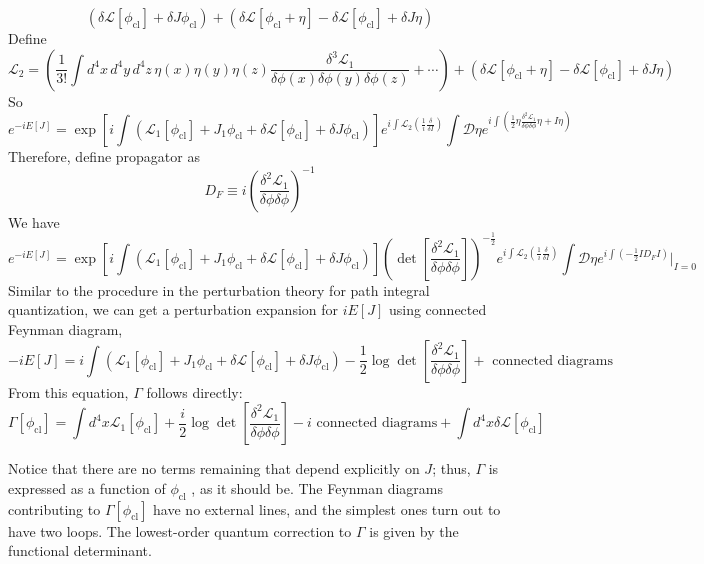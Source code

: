 \[(\delta \mathcal{L}[\phi_{\mathrm{cl}}] + \delta J \phi_{\mathrm{cl}} ) + ( \delta \mathcal{L}[\phi_{\mathrm{cl}} + \eta] - \delta\mathcal{L} [\phi_{\mathrm{cl}}] + \delta J \eta)\]
Define
\[\mathcal{L}_2 = \left(\frac{1}{3!} \int d^4x \, d^4y \, d^4z \, \eta(x) \eta(y) \eta(z) \frac{\delta^3 \mathcal{L}_1}{\delta \phi(x) \delta \phi(y) \delta \phi(z)} + \cdots \right) + ( \delta \mathcal{L}[\phi_{\mathrm{cl}} + \eta] - \delta\mathcal{L} [\phi_{\mathrm{cl}}] + \delta J \eta)\]
So
\[e^{-iE[J]} = \exp \left[ i \int ( \mathcal{L}_1 [\phi_{\mathrm{cl}}] + J_1\phi_{\mathrm{cl}} + \delta \mathcal{L}[\phi_{\mathrm{cl}}] + \delta J \phi_{\mathrm{cl}} )\right] e^{i\int \mathcal{L}_2(\frac{1}{i} \frac{\delta}{\delta I})} \int \mathcal{D}\eta e^{i\int \left(\frac{1}{2} \eta \frac{\delta^2 \mathcal{L}_1}{\delta \phi \delta \phi} \eta + I\eta \right)}\]
Therefore, define propagator as
\[D_F \equiv i \left( \frac{\delta^2 \mathcal{L}_1}{\delta \phi \delta \phi}\right)^{-1}\]
We have
\[e^{-iE[J]} = \exp \left[ i \int ( \mathcal{L}_1 [\phi_{\mathrm{cl}}] + J_1\phi_{\mathrm{cl}} + \delta \mathcal{L}[\phi_{\mathrm{cl}}] + \delta J \phi_{\mathrm{cl}} )\right] \left( \det \left[  \frac{\delta^2 \mathcal{L}_1}{\delta \phi \delta \phi} \right] \right) ^{-\frac{1}{2}} e^{i\int \mathcal{L}_2(\frac{1}{i} \frac{\delta}{\delta I})} \int \mathcal{D}\eta e^{i\int \left(-\frac{1}{2} I D_F I \right)} |_{I=0}\]
Similar to the procedure in the perturbation theory for path integral quantization, we can get a perturbation expansion for $iE[J]$ using connected Feynman diagram,
\[-iE[J] = i \int ( \mathcal{L}_1 [\phi_{\mathrm{cl}}] + J_1\phi_{\mathrm{cl}} + \delta \mathcal{L}[\phi_{\mathrm{cl}}] + \delta J \phi_{\mathrm{cl}} ) - \frac{1}{2} \log \det \left[  \frac{\delta^2 \mathcal{L}_1}{\delta \phi \delta \phi} \right] + \mbox{ connected diagrams }\]
From this equation, $\Gamma$ follows directly:
\[\Gamma[\phi_{\mathrm{cl}}] = \int d^4x \mathcal{L}_1[\phi_{\mathrm{cl}}] + \frac{i}{2} \log \det \left[  \frac{\delta^2 \mathcal{L}_1}{\delta \phi \delta \phi} \right] -i \mbox{ connected diagrams} + \int d^4x \delta\mathcal{L}[\phi_{\mathrm{cl}}]\]

Notice that there are no terms remaining that depend explicitly on $J$; thus, $\Gamma$ is expressed as a function of $\phi_{\mathrm{cl}}$ , as it should be. The Feynman diagrams contributing to $\Gamma[\phi_{\mathrm{cl}}]$ have no external lines, and the simplest ones turn out to have two loops. The lowest-order quantum correction to $\Gamma$ is given by the
functional determinant.

